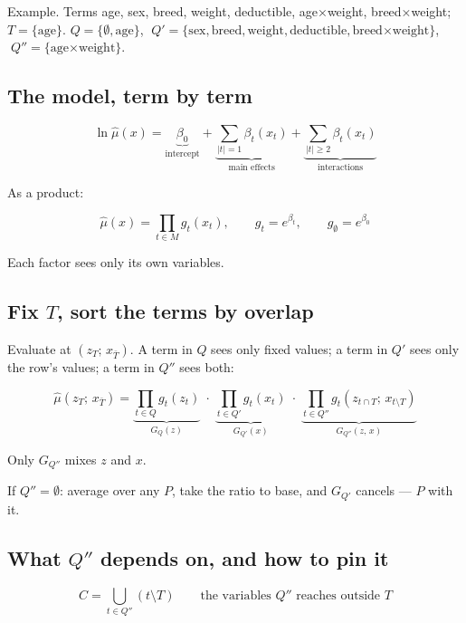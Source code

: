 \documentclass[
  letterpaper,
  DIV=11,
  numbers=noendperiod]{scrartcl}
\begin{document}
Example. Terms age, sex, breed, weight, deductible, age×weight,
breed×weight; \(T = \{\text{age}\}\). \(Q = \{\emptyset, \text{age}\}\),
\(\;Q' = \{\text{sex}, \text{breed}, \text{weight}, \text{deductible}, \text{breed×weight}\}\),
\(\;Q'' = \{\text{age×weight}\}\).

\subsection{The model, term by term}\label{the-model-term-by-term}

\[
\ln \hat{\mu}(x)
= \underbrace{\beta_0}_{\text{intercept}}
+ \underbrace{\sum_{|t| = 1} \beta_t(x_t)}_{\text{main effects}}
+ \underbrace{\sum_{|t| \geq 2} \beta_t(x_t)}_{\text{interactions}}
\]

As a product:

\[
\hat{\mu}(x) = \prod_{t \in M} g_t(x_t), \qquad g_t = e^{\beta_t}, \qquad g_\emptyset = e^{\beta_0}
\]

Each factor sees only its own variables.

\subsection{\texorpdfstring{Fix \(T\), sort the terms by
overlap}{Fix T, sort the terms by overlap}}\label{fix-t-sort-the-terms-by-overlap}

Evaluate at \((z_T;\, x_{\bar{T}})\). A term in \(Q\) sees only fixed
values; a term in \(Q'\) sees only the row's values; a term in \(Q''\)
sees both:

\[
\hat{\mu}(z_T;\, x_{\bar{T}})
= \underbrace{\prod_{t \in Q} g_t(z_t)}_{G_Q(z)}
\;\cdot\;
\underbrace{\prod_{t \in Q'} g_t(x_t)}_{G_{Q'}(x)}
\;\cdot\;
\underbrace{\prod_{t \in Q''} g_t(z_{t \cap T};\, x_{t \setminus T})}_{G_{Q''}(z,\, x)}
\]

Only \(G_{Q''}\) mixes \(z\) and \(x\).

If \(Q'' = \emptyset\): average over any \(P\), take the ratio to base,
and \(G_{Q'}\) cancels --- \(P\) with it.

\subsection{\texorpdfstring{What \(Q''\) depends on, and how to pin
it}{What Q\textquotesingle\textquotesingle{} depends on, and how to pin it}}\label{what-q-depends-on-and-how-to-pin-it}

\[
C = \bigcup_{t \in Q''} (t \setminus T)
\qquad \text{the variables } Q'' \text{ reaches outside } T
\]
\end{document}

